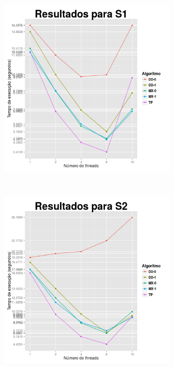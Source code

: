 \documentclass[10pt,a4paper,oneside]{article}
\begin{document}
\begin{figure}[t]
    \centering
    \begin{subfigure}[b]{0.49\textwidth}
      \centering
      \includegraphics[width=\textwidth]{S1.png}
    \end{subfigure}
    ~
    \begin{subfigure}[b]{0.49\textwidth}
      \centering
      \includegraphics[width=\textwidth]{S2.png}
    \end{subfigure}


\end{figure}
\end{document}
